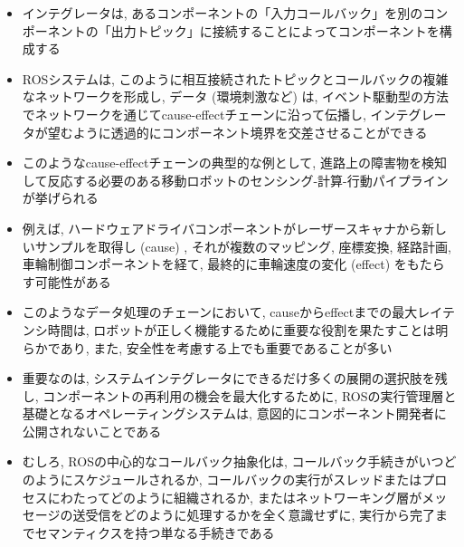 \begin{frame}{}
    \begin{itemize}
        \item インテグレータは, あるコンポーネントの「入力コールバック」を別のコンポーネントの「出力トピック」に接続することによってコンポーネントを構成する
        \item ROSシステムは, このように相互接続されたトピックとコールバックの複雑なネットワークを形成し, データ (環境刺激など) は, イベント駆動型の方法でネットワークを通じてcause-effectチェーンに沿って伝播し, インテグレータが望むように透過的にコンポーネント境界を交差させることができる
    \end{itemize}
\end{frame}

\begin{frame}{}
    \begin{itemize}
        \item このようなcause-effectチェーンの典型的な例として, 進路上の障害物を検知して反応する必要のある移動ロボットのセンシング-計算-行動パイプラインが挙げられる
        \item 例えば, ハードウェアドライバコンポーネントがレーザースキャナから新しいサンプルを取得し (cause) , それが複数のマッピング, 座標変換, 経路計画, 車輪制御コンポーネントを経て, 最終的に車輪速度の変化 (effect) をもたらす可能性がある
        \item このようなデータ処理のチェーンにおいて, causeからeffectまでの最大レイテンシ時間は, ロボットが正しく機能するために重要な役割を果たすことは明らかであり, また, 安全性を考慮する上でも重要であることが多い
    \end{itemize}
\end{frame}

\begin{frame}{}
    \begin{itemize}
        \item 重要なのは, システムインテグレータにできるだけ多くの展開の選択肢を残し, コンポーネントの再利用の機会を最大化するために, ROSの実行管理層と基礎となるオペレーティングシステムは, 意図的にコンポーネント開発者に公開されないことである
        \item むしろ, ROSの中心的なコールバック抽象化は, コールバック手続きがいつどのようにスケジュールされるか, コールバックの実行がスレッドまたはプロセスにわたってどのように組織されるか, またはネットワーキング層がメッセージの送受信をどのように処理するかを全く意識せずに, 実行から完了までセマンティクスを持つ単なる手続きである
    \end{itemize}
\end{frame}

